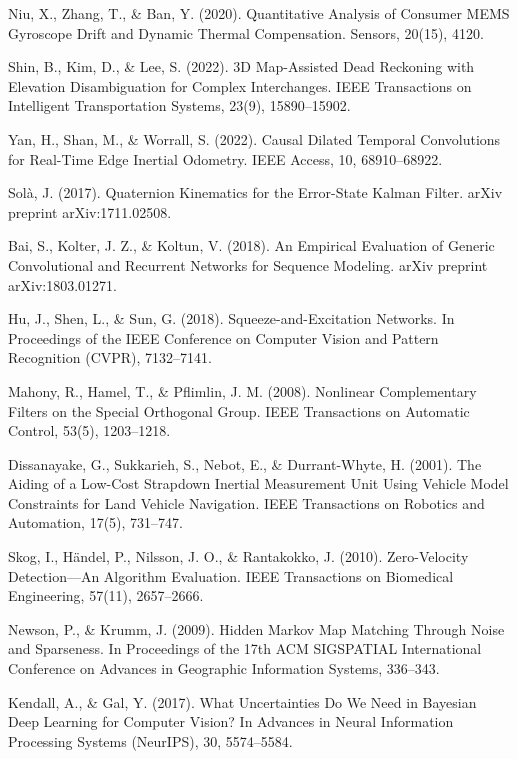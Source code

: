 \documentclass[11pt,a4paper]{article}
\begin{document}
\small
\begin{enumerate}[label={[\arabic*].},leftmargin=0.9cm,itemsep=3.2pt,resume]
\item Niu, X., Zhang, T., \& Ban, Y. (2020). Quantitative Analysis of Consumer MEMS Gyroscope Drift and Dynamic Thermal Compensation. Sensors, 20(15), 4120.
\item Shin, B., Kim, D., \& Lee, S. (2022). 3D Map-Assisted Dead Reckoning with Elevation Disambiguation for Complex Interchanges. IEEE Transactions on Intelligent Transportation Systems, 23(9), 15890--15902.
\item Yan, H., Shan, M., \& Worrall, S. (2022). Causal Dilated Temporal Convolutions for Real-Time Edge Inertial Odometry. IEEE Access, 10, 68910--68922.
\item Sol\`a, J. (2017). Quaternion Kinematics for the Error-State Kalman Filter. arXiv preprint arXiv:1711.02508.
\item Bai, S., Kolter, J. Z., \& Koltun, V. (2018). An Empirical Evaluation of Generic Convolutional and Recurrent Networks for Sequence Modeling. arXiv preprint arXiv:1803.01271.
\item Hu, J., Shen, L., \& Sun, G. (2018). Squeeze-and-Excitation Networks. In Proceedings of the IEEE Conference on Computer Vision and Pattern Recognition (CVPR), 7132--7141.
\item Mahony, R., Hamel, T., \& Pflimlin, J. M. (2008). Nonlinear Complementary Filters on the Special Orthogonal Group. IEEE Transactions on Automatic Control, 53(5), 1203--1218.
\item Dissanayake, G., Sukkarieh, S., Nebot, E., \& Durrant-Whyte, H. (2001). The Aiding of a Low-Cost Strapdown Inertial Measurement Unit Using Vehicle Model Constraints for Land Vehicle Navigation. IEEE Transactions on Robotics and Automation, 17(5), 731--747.
\item Skog, I., H\"andel, P., Nilsson, J. O., \& Rantakokko, J. (2010). Zero-Velocity Detection---An Algorithm Evaluation. IEEE Transactions on Biomedical Engineering, 57(11), 2657--2666.
\item Newson, P., \& Krumm, J. (2009). Hidden Markov Map Matching Through Noise and Sparseness. In Proceedings of the 17th ACM SIGSPATIAL International Conference on Advances in Geographic Information Systems, 336--343.
\item Kendall, A., \& Gal, Y. (2017). What Uncertainties Do We Need in Bayesian Deep Learning for Computer Vision? In Advances in Neural Information Processing Systems (NeurIPS), 30, 5574--5584.
\end{enumerate}
\vfill
\newpage
\end{document}
